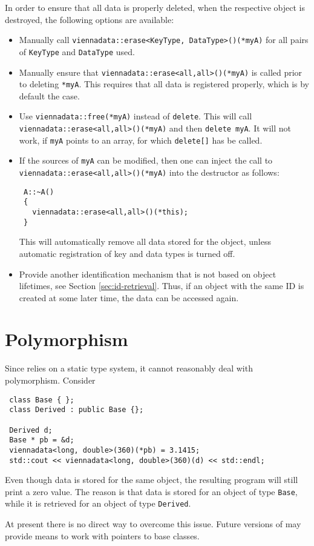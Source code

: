 In order to ensure that all data is properly deleted, when the respective object is destroyed, the following options are available:
\begin{itemize}
 \item Manually call \lstinline|viennadata::erase<KeyType, DataType>()(*myA)| for all pairs of \lstinline|KeyType| and \lstinline|DataType| used.
 \item Manually ensure that \lstinline|viennadata::erase<all,all>()(*myA)| is called prior to deleting \lstinline|*myA|. This requires that all data is registered properly, which is by default the case.
 \item Use \lstinline|viennadata::free(*myA)| instead of \lstinline|delete|. This will call \lstinline|viennadata::erase<all,all>()(*myA)| and then \lstinline|delete myA|. 
 It will not work, if \lstinline|myA| points to an array, for which \lstinline|delete[]| has be called.
 \item If the sources of \lstinline|myA| can be modified, then one can inject the call to \lstinline|viennadata::erase<all,all>()(*myA)| into the destructor as follows:
\begin{lstlisting}
 A::~A()
 {
   viennadata::erase<all,all>()(*this);
 }
\end{lstlisting}
This will automatically remove all data stored for the object, unless automatic registration of key and data types is turned off.
 \item Provide another identification mechanism that is not based on object lifetimes, see Section \ref{sec:id-retrieval}. Thus, if an object with the same ID is created at some later time, the data can be accessed again.
\end{itemize}


\section{Polymorphism}
Since {\ViennaData} relies on a static type system, it cannot reasonably deal with polymorphism. Consider
\begin{lstlisting}
 class Base { };
 class Derived : public Base {};

 Derived d;
 Base * pb = &d;
 viennadata<long, double>(360)(*pb) = 3.1415;
 std::cout << viennadata<long, double>(360)(d) << std::endl;
\end{lstlisting}
Even though data is stored for the same object, the resulting program will still print a zero value. 
The reason is that data is stored for an object of type \lstinline|Base|, while it is retrieved for an object of type \lstinline|Derived|.

At present there is no direct way to overcome this issue. Future versions of {\ViennaData} may provide means to work with pointers to base classes.


